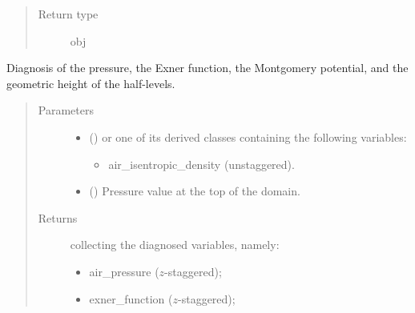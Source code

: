 \documentclass[letterpaper,10pt,english]{sphinxmanual}
\begin{document}
\begin{fulllineitems}
\begin{fulllineitems}
\begin{quote}
\begin{description}
\begin{itemize}
\end{itemize}


\item[{Return type}] \leavevmode
obj

\end{description}\end{quote}

\end{fulllineitems}


\begin{fulllineitems}
\label{\detokenize{api:dycore.diagnostic_isentropic.DiagnosticIsentropic.get_diagnostic_variables}}
Diagnosis of the pressure, the Exner function, the Montgomery potential, and the geometric height of the half-levels.
\begin{quote}\begin{description}
\item[{Parameters}] \leavevmode\begin{itemize}
\item {} 
 () \textendash{} 
{\hyperref[\detokenize{api:storages.grid_data.GridData}]{}} or one of its derived classes containing the following variables:
\begin{itemize}
\item {} 
air\_isentropic\_density (unstaggered).

\end{itemize}


\item {} 
 () \textendash{} Pressure value at the top of the domain.

\end{itemize}

\item[{Returns}] \leavevmode

{\hyperref[\detokenize{api:storages.grid_data.GridData}]{}} collecting the diagnosed variables, namely:
\begin{itemize}
\item {} 
air\_pressure (\(z\)-staggered);

\item {} 
exner\_function (\(z\)-staggered);


\end{itemize}
\end{description}
\end{quote}
\end{fulllineitems}
\end{fulllineitems}
\end{document}
